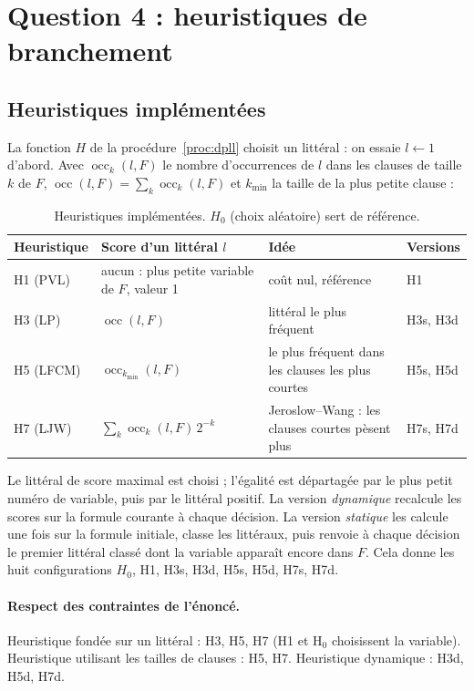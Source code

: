 \documentclass[11pt,a4paper]{article}
\newcommand{\occ}{\operatorname{occ}}
\begin{document}
\section{Question 4 : heuristiques de branchement}\label{sec:q4}

\subsection{Heuristiques implémentées}

La fonction $H$ de la procédure~\ref{proc:dpll} choisit un littéral : on essaie $l\leftarrow1$ d'abord. Avec $\occ_k(l,F)$ le nombre d'occurrences de $l$ dans les clauses de taille $k$ de $F$, $\occ(l,F)=\sum_k\occ_k(l,F)$ et $k_{\min}$ la taille de la plus petite clause :
\begin{table}[H]
\centering\small
\begin{tabular}{@{}llp{5.2cm}l@{}}
\toprule
Heuristique & Score d'un littéral $l$ & Idée & Versions\\
\midrule
H1 (PVL) & aucun : plus petite variable de $F$, valeur 1 & coût nul, référence & H1\\
H3 (LP) & $\occ(l,F)$ & littéral le plus fréquent & H3s, H3d\\
H5 (LFCM) & $\occ_{k_{\min}}(l,F)$ & le plus fréquent dans les clauses les plus courtes & H5s, H5d\\
H7 (LJW) & $\sum_k\occ_k(l,F)\,2^{-k}$ & Jeroslow--Wang : les clauses courtes pèsent plus & H7s, H7d\\
\bottomrule
\end{tabular}
\caption{Heuristiques implémentées. $H_0$ (choix aléatoire) sert de référence.}
\label{tab:heur}
\end{table}
Le littéral de score maximal est choisi ; l'égalité est départagée par le plus petit numéro de variable, puis par le littéral positif. La version \emph{dynamique} recalcule les scores sur la formule courante à chaque décision. La version \emph{statique} les calcule une fois sur la formule initiale, classe les littéraux, puis renvoie à chaque décision le premier littéral classé dont la variable apparaît encore dans $F$. Cela donne les huit configurations $H_0$, H1, H3s, H3d, H5s, H5d, H7s, H7d.

\paragraph{Respect des contraintes de l'énoncé.} Heuristique fondée sur un littéral : H3, H5, H7 (H1 et H$_0$ choisissent la variable). Heuristique utilisant les tailles de clauses : H5, H7. Heuristique dynamique : H3d, H5d, H7d.
\end{document}
